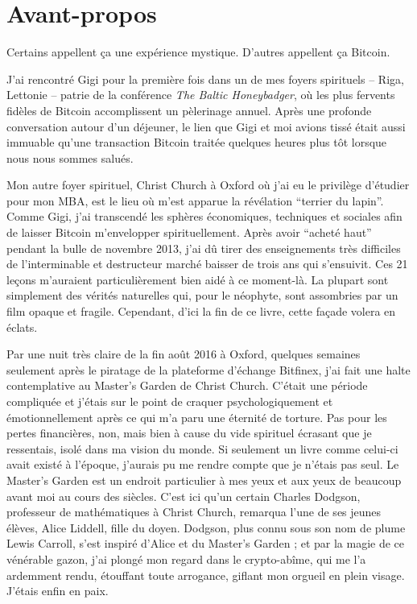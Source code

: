 \chapter*{Avant-propos}

Certains appellent ça une expérience mystique. D'autres appellent ça Bitcoin.

J'ai rencontré Gigi pour la première fois dans un de mes foyers spirituels --
Riga, Lettonie -- patrie de la conférence \textit{The Baltic Honeybadger}, où
les plus fervents fidèles de Bitcoin accomplissent un pèlerinage annuel. Après
une profonde conversation autour d'un déjeuner, le lien que Gigi et moi avions
tissé était aussi immuable qu'une transaction Bitcoin traitée quelques heures
plus tôt lorsque nous nous sommes salués.

Mon autre foyer spirituel, Christ Church à Oxford où j'ai eu le privilège
d'étudier pour mon MBA, est le lieu où m'est apparue la révélation
\enquote{terrier du lapin}. Comme Gigi, j'ai transcendé les sphères économiques,
techniques et sociales afin de laisser Bitcoin m'envelopper spirituellement.
Après avoir \enquote{acheté haut} pendant la bulle de novembre 2013, j'ai dû
tirer des enseignements très difficiles de l'interminable et destructeur marché
baisser de trois ans qui s'ensuivit. Ces 21 leçons m'auraient particulièrement
bien aidé à ce moment-là. La plupart sont simplement des vérités naturelles qui,
pour le néophyte, sont assombries par un film opaque et fragile. Cependant,
d'ici la fin de ce livre, cette façade volera en éclats.

Par une nuit très claire de la fin août 2016 à Oxford, quelques semaines
seulement après le piratage de la plateforme d'échange Bitfinex, j'ai fait une
halte contemplative au Master's Garden de Christ Church. C'était une période
compliquée et j'étais sur le point de craquer psychologiquement et
émotionnellement après ce qui m'a paru une éternité de torture. Pas pour les
pertes financières, non, mais bien à cause du vide spirituel écrasant que je
ressentais, isolé dans ma vision du monde. Si seulement un livre comme celui-ci
avait existé à l'époque, j'aurais pu me rendre compte que je n'étais pas seul.
Le Master’s Garden est un endroit particulier à mes yeux et aux yeux de beaucoup
avant moi au cours des siècles. C'est ici qu'un certain Charles Dodgson,
professeur de mathématiques à Christ Church, remarqua l'une de ses jeunes
élèves, Alice Liddell, fille du doyen. Dodgson, plus connu sous son nom de plume
Lewis Carroll, s'est inspiré d'Alice et du Master's Garden ; et par la magie de
ce vénérable gazon, j'ai plongé mon regard dans le crypto-abîme, qui me l'a
ardemment rendu, étouffant toute arrogance, giflant mon orgueil en plein visage.
J'étais enfin en paix.

